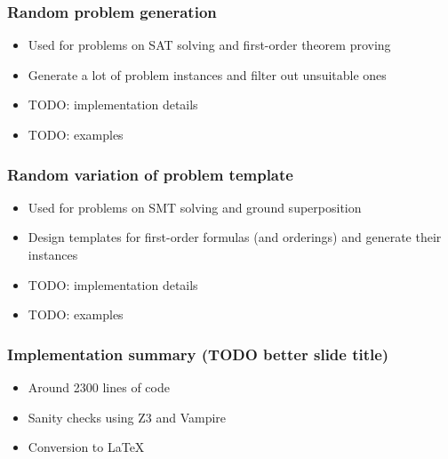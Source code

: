 \documentclass[xcolor={table}]{beamer}
\begin{document}


\begin{frame}
\frametitle{Random problem generation}
\begin{itemize}
\item Used for problems on SAT solving and first-order theorem proving
\item Generate a lot of problem instances and filter out unsuitable ones
\item TODO: implementation details
\item TODO: examples
\end{itemize}
\end{frame}



\begin{frame}
\frametitle{Random variation of problem template}
\begin{itemize}
\item Used for problems on SMT solving and ground superposition
\item Design templates for first-order formulas (and orderings)
  and generate their instances
\item TODO: implementation details
\item TODO: examples
\end{itemize}
\end{frame}



\begin{frame}
\frametitle{Implementation summary (TODO better slide title)}
\begin{itemize}
\item Around 2300 lines of code
\item Sanity checks using Z3 and Vampire
\item Conversion to \LaTeX
\end{itemize}
\end{frame}


\end{document}
